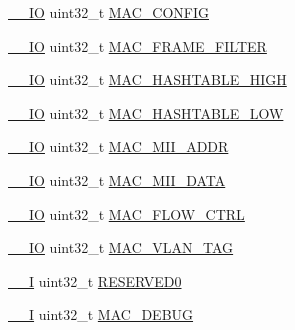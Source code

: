 \begin{DoxyCompactItemize}
\item 
\hyperlink{core__sc300_8h_aec43007d9998a0a0e01faede4133d6be}{\+\_\+\+\_\+\+IO} uint32\+\_\+t \hyperlink{struct_l_p_c___e_n_e_t___t_aff742ee6d4fa89e5b2fc8c9102afe19d}{M\+A\+C\+\_\+\+C\+O\+N\+F\+IG}
\item 
\hyperlink{core__sc300_8h_aec43007d9998a0a0e01faede4133d6be}{\+\_\+\+\_\+\+IO} uint32\+\_\+t \hyperlink{struct_l_p_c___e_n_e_t___t_a1ab7299bfb1e439a585f114c339d70ce}{M\+A\+C\+\_\+\+F\+R\+A\+M\+E\+\_\+\+F\+I\+L\+T\+ER}
\item 
\hyperlink{core__sc300_8h_aec43007d9998a0a0e01faede4133d6be}{\+\_\+\+\_\+\+IO} uint32\+\_\+t \hyperlink{struct_l_p_c___e_n_e_t___t_a9f1ea5ec0a4ad870ac1026564860a1d6}{M\+A\+C\+\_\+\+H\+A\+S\+H\+T\+A\+B\+L\+E\+\_\+\+H\+I\+GH}
\item 
\hyperlink{core__sc300_8h_aec43007d9998a0a0e01faede4133d6be}{\+\_\+\+\_\+\+IO} uint32\+\_\+t \hyperlink{struct_l_p_c___e_n_e_t___t_a4177c1198137537bf14e66c28c0da8cd}{M\+A\+C\+\_\+\+H\+A\+S\+H\+T\+A\+B\+L\+E\+\_\+\+L\+OW}
\item 
\hyperlink{core__sc300_8h_aec43007d9998a0a0e01faede4133d6be}{\+\_\+\+\_\+\+IO} uint32\+\_\+t \hyperlink{struct_l_p_c___e_n_e_t___t_aa3daee3839be211b1a0437a2b45f821a}{M\+A\+C\+\_\+\+M\+I\+I\+\_\+\+A\+D\+DR}
\item 
\hyperlink{core__sc300_8h_aec43007d9998a0a0e01faede4133d6be}{\+\_\+\+\_\+\+IO} uint32\+\_\+t \hyperlink{struct_l_p_c___e_n_e_t___t_a502b5c5f0dc9c04d0344f88857d70ceb}{M\+A\+C\+\_\+\+M\+I\+I\+\_\+\+D\+A\+TA}
\item 
\hyperlink{core__sc300_8h_aec43007d9998a0a0e01faede4133d6be}{\+\_\+\+\_\+\+IO} uint32\+\_\+t \hyperlink{struct_l_p_c___e_n_e_t___t_a460b81474c00863d205877ff830ec1e2}{M\+A\+C\+\_\+\+F\+L\+O\+W\+\_\+\+C\+T\+RL}
\item 
\hyperlink{core__sc300_8h_aec43007d9998a0a0e01faede4133d6be}{\+\_\+\+\_\+\+IO} uint32\+\_\+t \hyperlink{struct_l_p_c___e_n_e_t___t_a2ca360978300772083d55bd0e9d86cd3}{M\+A\+C\+\_\+\+V\+L\+A\+N\+\_\+\+T\+AG}
\item 
\hyperlink{core__sc300_8h_af63697ed9952cc71e1225efe205f6cd3}{\+\_\+\+\_\+I} uint32\+\_\+t \hyperlink{struct_l_p_c___e_n_e_t___t_ad06839c5382047f4f9f2c74cc61db942}{R\+E\+S\+E\+R\+V\+E\+D0}
\item 
\hyperlink{core__sc300_8h_af63697ed9952cc71e1225efe205f6cd3}{\+\_\+\+\_\+I} uint32\+\_\+t \hyperlink{struct_l_p_c___e_n_e_t___t_a91d92f7bb3d1ac0cf1acbcab4f0cb1ad}{M\+A\+C\+\_\+\+D\+E\+B\+UG}

\end{DoxyCompactItemize}
